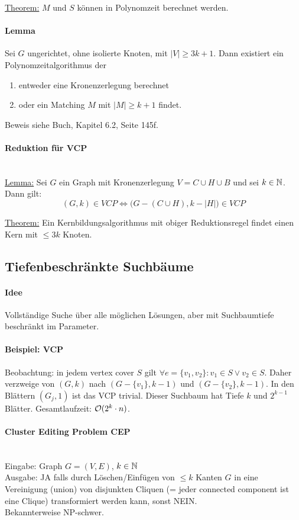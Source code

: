 \underline{Theorem:} $M$ und $S$ können in Polynomzeit berechnet werden.

\paragraph{Lemma}
Sei $G$ ungerichtet, ohne isolierte Knoten, mit $|V| \geq 3k+1$.
Dann existiert ein Polynomzeitalgorithmus der
\begin{enumerate}[label=(\roman*)]
    \item entweder eine Kronenzerlegung berechnet
    \item oder ein Matching $M$ mit $|M| \geq k+1$ findet.
\end{enumerate}
Beweis siehe Buch, Kapitel 6.2, Seite 145f.

\paragraph{Reduktion für VCP} \mbox{} \\
\underline{Lemma:}
Sei $G$ ein Graph mit Kronenzerlegung $V = C \cup H \cup B$ und sei $k \in \mathbb{N}$. Dann gilt: \\
$$ (G, k) \in VCP \iff \Big( G - (C \cup H), k - |H| \Big) \in VCP $$

\underline{Theorem:} Ein Kernbildungsalgorithmus mit obiger Reduktionsregel 
findet einen Kern mit $\leq 3k$ Knoten.


\subsection{Tiefenbeschränkte Suchbäume}

\paragraph{Idee}
Vollständige Suche über alle möglichen Lösungen, aber mit Suchbaumtiefe beschränkt im Parameter.

\paragraph{Beispiel: VCP}
Beobachtung: in jedem vertex cover $S$ gilt $\forall e = \{v_1, v_2\} : v_1 \in S \vee v_2 \in S$.
Daher verzweige von $(G, k)$ nach $(G-\{v_1\}, k-1)$ und $(G-\{v_2\}, k-1)$.
In den Blättern $(G_j, 1)$ ist das VCP trivial.
Dieser Suchbaum hat Tiefe $k$ und $2^{k-1}$ Blätter.
Gesamtlaufzeit: $\mathcal{O} (2^k \cdot n)$.

\paragraph{Cluster Editing Problem CEP} \mbox{} \\
Eingabe: Graph $G = (V, E)$, $k \in \mathbb{N}$ \\
Ausgabe: JA falls durch Löschen/Einfügen von $\leq k$ Kanten $G$ in eine Vereinigung (union) von disjunkten Cliquen
(= jeder connected component ist eine Clique) transformiert werden kann, sonst NEIN. \\
Bekannterweise NP-schwer.

